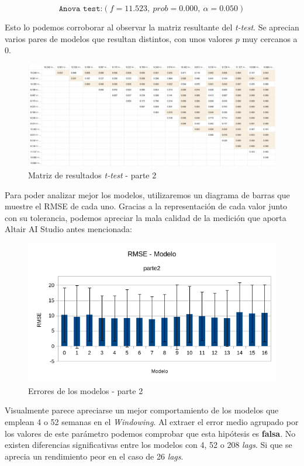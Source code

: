 \documentclass[12pt]{report} %
\begin{document}
$$\texttt{Anova test:} (f = 11.523,~prob = 0.000,~\alpha=0.050)$$

Esto lo podemos corroborar al observar la matriz resultante del \textit{t-test}. Se aprecian varios pares de modelos que resultan distintos, con unos valores $p$ muy cercanos a 0.

\begin{figure}[H]
    \includegraphics[width=\linewidth]{t-testp2.jpeg}
    \caption {\small Matriz de resultados \textit{t-test} - parte 2}
\end{figure}

Para poder analizar mejor los modelos, utilizaremos un diagrama de barras que muestre el RMSE de cada uno. Gracias a la representación de cada valor junto con su tolerancia, podemos apreciar la mala calidad de la medición que aporta Altair AI Studio antes mencionada:

\begin{figure}[H]
    \includegraphics[width=\linewidth]{RMSE-modelsp2.png}
    \caption {\small Errores de los modelos - parte 2}
\end{figure}

Visualmente parece apreciarse un mejor comportamiento de los modelos que emplean 4 o 52 semanas en el \textit{Windowing}. Al extraer el error medio agrupado por los valores de este parámetro podemos comprobar que esta hipótesis es \textbf{falsa}. No existen diferencias significativas entre los modelos con 4, 52 o 208 \textit{lags}. Si que se aprecia un rendimiento peor en el caso de 26 \textit{lags}.
\end{document}
